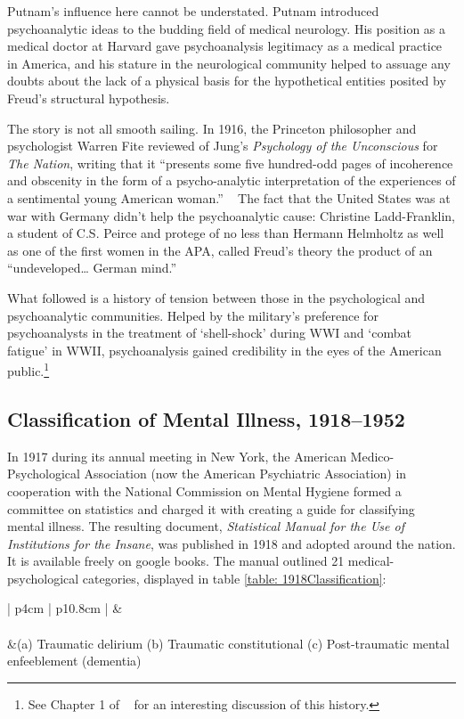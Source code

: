 \begin{refsection}
Putnam’s influence here cannot be understated. Putnam introduced psychoanalytic ideas to the budding field of medical neurology. His position as a medical doctor at Harvard gave psychoanalysis legitimacy as a medical practice in America, and his stature in the neurological community helped to assuage any doubts about the lack of a physical basis for the hypothetical entities posited by Freud's structural hypothesis.

The story is not all smooth sailing. In 1916, the Princeton philosopher and psychologist Warren Fite reviewed of Jung's \emph{Psychology of the Unconscious} for \emph{The Nation}, writing that it “presents some five hundred-odd pages of incoherence and obscenity in the form of a psycho-analytic interpretation of the experiences of a sentimental young American woman.” ~\citep{Fite:1916tk} The fact that the United States was at war with Germany didn't help the psychoanalytic cause: Christine Ladd-Franklin, a student of C.S. Peirce and protege of no less than Hermann Helmholtz as well as one of the first women in the APA, called Freud's theory the product of an “undeveloped{\ldots} German mind.”

What followed is a history of tension between those in the psychological and psychoanalytic communities. Helped by the military's preference for psychoanalysts in the treatment of `shell-shock' during WWI and `combat fatigue' in WWII, psychoanalysis gained credibility in the eyes of the American public.\footnote{See Chapter 1 of ~\citep{Menninger:3tUbEPj8} for an interesting discussion of this history.}

\subsection{Classification of Mental Illness, 1918--1952}
\label{classificationofmentalillness1918-1952}

In 1917 during its annual meeting in New York, the American Medico-Psychological Association (now the American Psychiatric Association) in cooperation with the National Commission on Mental Hygiene formed a committee on statistics and charged it with creating a guide for classifying mental illness. The resulting document, \emph{Statistical Manual for the Use of Institutions for the Insane}, was published in 1918 and adopted around the nation. It is available freely on google books. The manual outlined 21 medical-psychological categories, displayed in table \ref{table: 1918Classification}:

 \begin{longtable}[!t]{ | p{4cm} | p{10.8cm} | }
\hline
{}& \\ \hline
{} \\ \hline
 &(a) Traumatic delirium \newline
(b) Traumatic constitutional \newline
(c) Post-traumatic mental enfeeblement (dementia)\\


\end{longtable}
\end{refsection}
